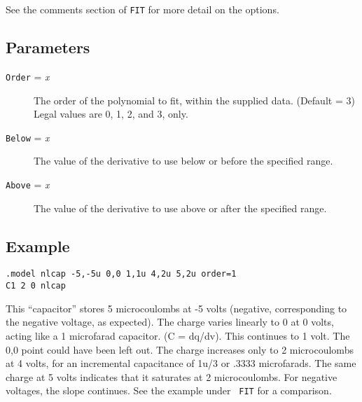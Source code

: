 See the comments section of {\tt FIT} for more detail on the options.
\subsection{Parameters}

\begin{description}
  
\item[{\tt Order} = {\it x}] The order of the polynomial to fit,
  within the supplied data.  (Default = 3) Legal values are 0, 1, 2,
  and 3, only.

\item[{\tt Below} = {\it x}] The value of the derivative to use
below or before the specified range.  

\item[{\tt Above} = {\it x}] The value of the derivative to use
above or after the specified range.

\end{description}
\subsection{Example} 

\begin{verbatim}
.model nlcap -5,-5u 0,0 1,1u 4,2u 5,2u order=1
C1 2 0 nlcap
\end{verbatim}

This ``capacitor'' stores 5 microcoulombs at -5 volts (negative,
corresponding to the negative voltage, as expected).  The charge
varies linearly to 0 at 0 volts, acting like a 1 microfarad capacitor.
(C = dq/dv).  This continues to 1 volt.  The 0,0 point could have been
left out.  The charge increases only to 2 microcoulombs at 4 volts,
for an incremental capacitance of 1u/3 or .3333 microfarads.  The same
charge at 5 volts indicates that it saturates at 2 microcoulombs.  For
negative voltages, the slope continues.  See the example under {\tt
  FIT} for a comparison.
